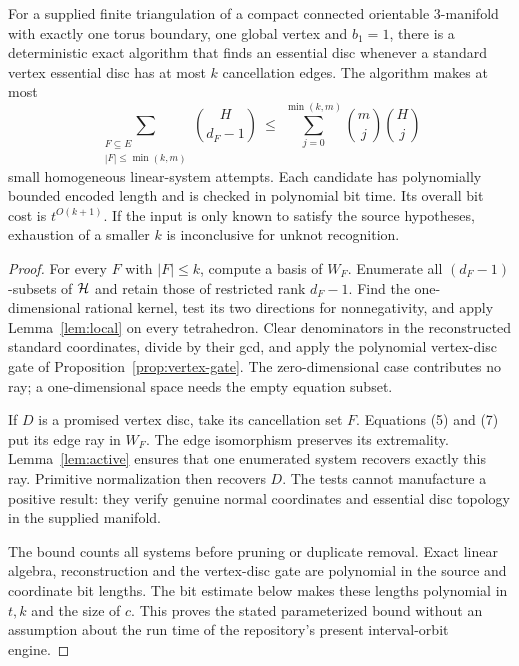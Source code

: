\begin{theorem}
\label{thm:discovery}
For a supplied finite triangulation of a compact connected orientable
3-manifold with exactly one torus boundary, one global vertex and $b_1=1$,
there is a
deterministic exact algorithm that finds an essential disc whenever a
standard vertex essential disc has at most $k$ cancellation edges.
The algorithm makes at most
\[
       \sum_{\substack{F\subseteq E\\|F|\le\min(k,m)}}\binom H{d_F-1}
       \ \le\ \sum_{j=0}^{\min(k,m)}\binom mj\binom Hj     \tag{8}\label{eq:basic-count}
\]
small homogeneous linear-system attempts.
Each candidate has polynomially bounded encoded length and is checked
in polynomial bit time. Its overall bit cost is $t^{O(k+1)}$.
If the input is only known to satisfy the source hypotheses, exhaustion
of a smaller $k$ is inconclusive for unknot recognition.
\end{theorem}
\begin{proof}
For every $F$ with $|F|\le k$, compute a basis of $W_F$. Enumerate all
$(d_F-1)$-subsets of $\mathcal H$ and retain those of restricted rank $d_F-1$.
Find the one-dimensional rational kernel, test its two directions for
nonnegativity, and apply Lemma~\ref{lem:local} on every tetrahedron.
Clear denominators in the reconstructed standard coordinates, divide by
their gcd, and apply the polynomial vertex-disc gate of
Proposition~\ref{prop:vertex-gate}. The zero-dimensional case contributes
no ray; a
one-dimensional space needs the empty equation subset.

If $D$ is a promised vertex disc, take its cancellation set $F$. Equations
(5) and (7) put its edge ray in $W_F$. The edge isomorphism preserves its
extremality. Lemma~\ref{lem:active} ensures that one enumerated system
recovers exactly this ray. Primitive normalization then recovers $D$.
The tests cannot manufacture a positive result: they verify genuine
normal coordinates and essential disc topology in the supplied manifold.

The bound counts all systems before pruning or duplicate removal. Exact
linear algebra, reconstruction and the vertex-disc gate are polynomial
in the source and coordinate bit lengths. The bit estimate below makes
these lengths polynomial in $t,k$ and the size of $c$. This proves the
stated parameterized bound without an assumption about the run time of
the repository's present interval-orbit engine.
\end{proof}

